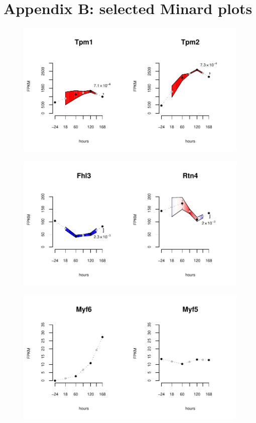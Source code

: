 \documentclass[12pt]{amsart}
\theoremstyle{definition}
\begin{document}
\section{Appendix B: selected Minard plots}
\begin{figure}[!ht] 
    \includegraphics{pdfs/Tpm1_Tpm2.pdf}
\end{figure}
\begin{figure}[!ht] 
    \includegraphics{pdfs/Fhl3_RTN4.pdf}
\end{figure}
\newpage
\begin{figure}[!ht] 
    \includegraphics{pdfs/Myf6_Myf5.pdf}
\end{figure}
\end{document}
